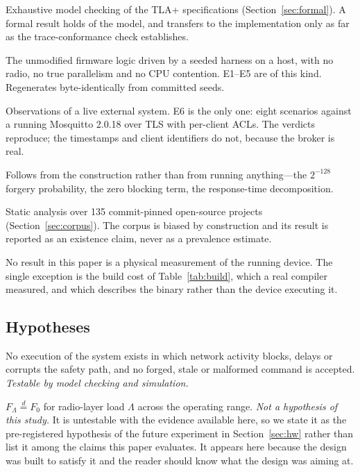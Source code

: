 \begin{description}[leftmargin=1.6em,itemsep=0.2em]
\item[Formal.] Exhaustive model checking of the TLA+ specifications (Section~\ref{sec:formal}).
A formal result holds of the model, and transfers to the implementation only as far as the
trace-conformance check establishes.
\item[Simulation.] The unmodified firmware logic driven by a seeded harness on a host, with no
radio, no true parallelism and no CPU contention. E1--E5 are of this kind. Regenerates
byte-identically from committed seeds.
\item[Testbed measurement.] Observations of a live external system. E6 is the only one: eight
scenarios against a running Mosquitto 2.0.18 over TLS with per-client ACLs. The verdicts
reproduce; the timestamps and client identifiers do not, because the broker is real.
\item[Analytical.] Follows from the construction rather than from running anything---the
$2^{-128}$ forgery probability, the zero blocking term, the response-time decomposition.
\item[Corpus study.] Static analysis over 135 commit-pinned open-source projects
(Section~\ref{sec:corpus}). The corpus is biased by construction and its result is reported as
an existence claim, never as a prevalence estimate.
\end{description}

\noindent No result in this paper is a physical measurement of the running device. The single
exception is the build cost of Table~\ref{tab:build}, which a real compiler measured, and
which describes the binary rather than the device executing it.

\subsection{Hypotheses}

\begin{description}[leftmargin=1.6em,itemsep=0.2em]
\item[H1 (logical isolation).] No execution of the system exists in which network activity
blocks, delays or corrupts the safety path, and no forged, stale or malformed command is
accepted. \emph{Testable by model checking and simulation.}
\item[H2 (timing isolation).] $F_{\Lambda} \stackrel{d}{=} F_{0}$ for radio-layer load $\Lambda$
across the operating range. \emph{Not a hypothesis of this study.} It is untestable with the
evidence available here, so we state it as the pre-registered hypothesis of the future experiment
in Section~\ref{sec:hw} rather than list it among the claims this paper evaluates. It appears here
because the design was built to satisfy it and the reader should know what the design was aiming
at.
\end{description}

